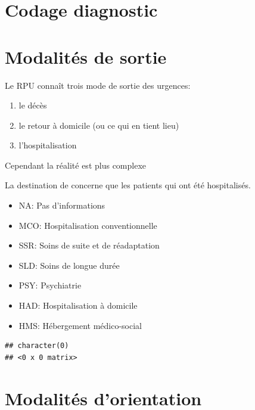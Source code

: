 \documentclass[12pt,english,french]{report}\usepackage{graphicx, color}
\makeatletter
\newenvironment{kframe}{%
 \def\at@end@of@kframe{}%
 \ifinner\ifhmode%
  \def\at@end@of@kframe{\end{minipage}}%
  \begin{minipage}{\columnwidth}%
 \fi\fi%
 \def\FrameCommand##1{\hskip\@totalleftmargin \hskip-\fboxsep
 \colorbox{shadecolor}{##1}\hskip-\fboxsep
     \hskip-\linewidth \hskip-\@totalleftmargin \hskip\columnwidth}%
 \MakeFramed {\advance\hsize-\width
   \@totalleftmargin\z@ \linewidth\hsize
   \@setminipage}}%
 {\par\unskip\endMakeFramed%
 \at@end@of@kframe}
\newenvironment{knitrout}{}{} %
\makeatother
\begin{document}
\chapter{Codage diagnostic}

\chapter{Modalités de sortie}


Le RPU connaît trois mode de sortie des urgences:
\begin{enumerate}
  \item le décès
  \item le retour à domicile (ou ce qui en tient lieu)
  \item l'hospitalisation
\end{enumerate}
Cependant la réalité est plus complexe

La destination de concerne que les patients qui ont été hospitalisés.

\begin{itemize}
  \item NA:    Pas d'informations
  \item MCO:		Hospitalisation conventionnelle
  \item SSR:		Soins de suite et de réadaptation
  \item SLD:		Soins de longue durée
  \item PSY: 		Psychiatrie
  \item HAD:		Hospitalisation à domicile
  \item HMS:		Hébergement médico-social
\end{itemize}

\begin{knitrout}
\color{fgcolor}\begin{kframe}


{\ttfamily\noindent\bfseries\color{errorcolor}{\#\# Error: replacement has 0 rows, data has 105979}}\begin{verbatim}
## character(0)
## <0 x 0 matrix>
\end{verbatim}
\end{kframe}
\end{knitrout}



\chapter{Modalités d'orientation}
\end{document}
